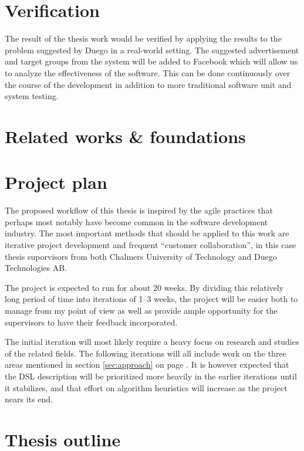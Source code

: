 \documentclass{article}
\begin{document}
\section{Verification}
The result of the thesis work would be verified by applying the results to the problem suggested by Duego in a real-world setting. The suggested advertisement and target groups from the system will be added to Facebook which will allow us to analyze the effectiveness of the software. This can be done continuously over the course of the development in addition to more traditional software unit and system testing.

\section{Related works \& foundations}

\section{Project plan}
The proposed workflow of this thesis is inspired by the agile practices that perhaps most notably have become 
common in the software development industry. The most important methods that should be applied to this work are
iterative project development and frequent ``customer collaboration'', in this case thesis suporvisors from both
Chalmers University of Technology and Duego Technologies AB.

The project is expected to run for about 20 weeks. By dividing this relatively long period of time into iterations
of 1--3 weeks, the project will be easier both to manage from my point of view as well as provide ample opportunity
for the supervisors to have their feedback incorporated.

The initial iteration will most likely require a heavy focus on research and studies of the related fields. The following
iterations will all include work on the three areas mentioned in section \ref{sec:approach} on page \pageref{sec:approach}. It is however expected that the DSL description will be prioritized more heavily in the earlier iterations until it stabilizes, and that effort on algorithm heuristics will increase as the project nears its end.

\section{Thesis outline}
\end{document}
